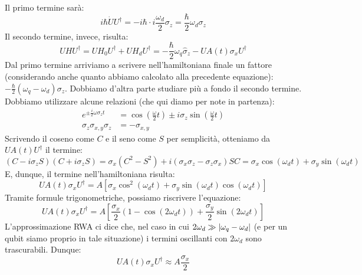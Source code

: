 Il primo termine sarà:
\begin{equation*}
    i \hbar \dot U U^\dagger = - i \hbar \cdot i \frac{\omega_d}{2}\sigma_z = \frac{\hbar }{2}\omega_d \sigma_z
\end{equation*}
Il secondo termine, invece, risulta:
\begin{equation*}
    U H U^\dagger = U H_0 U^\dagger + U H_d U^\dagger =  -\frac{\hbar}{2}\omega_q \hat \sigma_z -UA(t)\sigma_x U^\dagger
\end{equation*}
Dal primo termine arriviamo a scrivere nell'hamiltoniana finale un fattore (considerando anche quanto abbiamo calcolato alla precedente equazione): $-\frac{\hbar}{2}(\omega_q - \omega_d)\sigma_z$.
Dobbiamo d'altra parte studiare più a fondo il secondo termine. Dobbiamo utilizzare alcune relazioni (che qui diamo per note in partenza):
\begin{align*}
    e^{\pm \frac{i}{2} \omega \sigma_z t } &= \cos \left( \frac{\omega}{2}t \right) \pm i \sigma_z\sin \left( \frac{\omega}{2}t \right) \\
    \sigma_z \sigma_{x,y} \sigma_z &= - \sigma_{x,y}
\end{align*}
Scrivendo il coseno come $C$ e il seno come $S$ per semplicità, otteniamo da $UA(t)U^\dagger$ il termine:
\begin{equation*}
    \left(C-i \sigma_z S\right)\left( C + i \sigma_z S\right) = \sigma_x \left( C ^2 - S^2 \right) + i \left( \sigma_x \sigma_z - \sigma_z \sigma_x \right) SC = \sigma_x \cos \left(\omega_d t \right) +  \sigma_y \sin \left( \omega_d t \right)
\end{equation*}
E, dunque, il termine nell'hamiltoniana risulta:
\begin{equation*}
    UA(t)\sigma_x U^\dagger = A \left[ \sigma_x \cos^2 \left(\omega_d t \right) +  \sigma_y \sin \left( \omega_d t \right) \cos \left( \omega_d t \right) \right]
\end{equation*}
Tramite formule trigonometriche, possiamo riscrivere l'equazione:
\begin{equation*}
    UA(t)\sigma_x U^\dagger = A \left[ \frac{\sigma_x}{2}\left( 1 - \cos (2\omega_d t ) \right) + \frac{\sigma_y}{2}\sin (2 \omega_d t ) \right]
\end{equation*}
L'approssimazione RWA ci dice che, nel caso in cui $2 \omega_d \gg \abs{\omega_q - \omega_d}$ (e per un qubit siamo proprio in tale situazione) i termini oscillanti con $2\omega_d$ sono trascurabili. Dunque:
\begin{equation*}
    UA(t) \sigma_x U^\dagger \approx A\frac{\sigma_x}{2}
\end{equation*}
